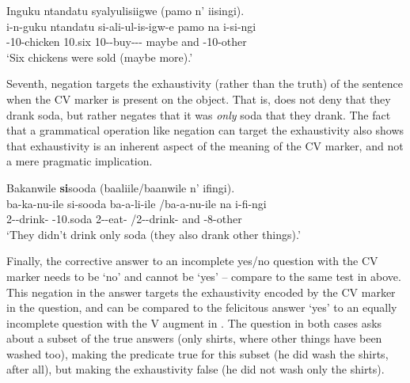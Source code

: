 \documentclass[output=paper]{langscibook}
\begin{document}
\ex
\label{bkm:Ref56945623:b}
Inguku ntandatu syalyulisiigwe (pamo n’ iisingi).\\
\gll
i-n-guku  ntandatu  si-ali-ul-is-igw-e  pamo  na  i-si-ngi\\
\AUG{}-10-chicken  10.six  10\SM{}-\PST{}-buy-\CAUS-\PASS{}-\FV{}  maybe  and  \AUG{}-10-other\\
\glt
‘Six chickens were sold (maybe more).’ \citep[339]{vanderWalLusekelo2022}\\

\z
\z

Seventh, negation targets the exhaustivity (rather than the truth) of the sentence when the CV marker is present on the object. That is,  does not deny that they drank soda, but rather negates that it was \textit{only} soda that they drank. The fact that a grammatical operation like negation can target the exhaustivity also shows that exhaustivity is an inherent aspect of the meaning of the CV marker, and not a mere pragmatic implication.

\ea
\label{bkm:Ref76979472}
Bakanwile \textbf{si}sooda (baaliile/baanwile n’ ifingi).\\
\gll
ba-ka-nu-ile   si-sooda  ba-a-li-ile  /ba-a-nu-ile  na  i-fi-ngi\\
2\SM{}-\NEG{}-drink-\PFV{}  \EXH{}-10.soda  2\SM{}-\PST{}-eat-\PFV{}  /2\SM{}-\PST{}-drink-\PFV{}  and  \AUG{}-8-other\\
\glt
‘They didn’t drink only soda (they also drank other things).’ \citep[340]{vanderWalLusekelo2022}\\

\z


Finally, the corrective answer to an incomplete yes/no question with the CV marker needs to be ‘no’ and cannot be ‘yes’ – compare to the same test in  above. This negation in the answer targets the exhaustivity encoded by the CV marker in the question, and can be compared to the felicitous answer ‘yes’ to an equally incomplete question with the V augment in . The question in both cases asks about a subset of the true answers (only shirts, where other things have been washed too), making the predicate true for this subset (he did wash the shirts, after all), but making the exhaustivity false (he did not wash only the shirts).
\end{document}
